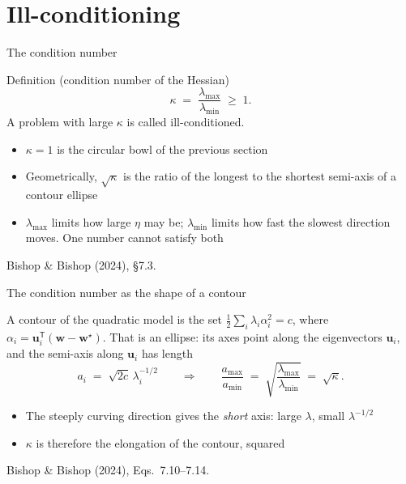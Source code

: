 \documentclass[aspectratio=169, 11pt]{beamer}
\newcommand{\srcline}[1]{%
  \par\vspace{0.25em}%
  {\scriptsize\color{mcMuted}\hfill #1\par}}
\newcommand{\src}[3]{}      %
\begin{document}
\section{Ill-conditioning}

\begin{frame}{The condition number}
  \src{bishop2024}{section}{7.3}
  \begin{block}{Definition (condition number of the Hessian)}
    \[
      \kappa \;=\; \frac{\lambda_{\max}}{\lambda_{\min}} \;\geq\; 1 .
    \]
    A problem with large $\kappa$ is called \alert{ill-conditioned}.
  \end{block}
  \vspace{0.4em}
  \begin{itemize}\itemsep0.4em
    \item $\kappa = 1$ is the circular bowl of the previous section
    \item Geometrically, $\sqrt{\kappa}$ is the ratio of the longest to
          the shortest semi-axis of a contour ellipse
    \item $\lambda_{\max}$ limits how large $\eta$ may be;
          $\lambda_{\min}$ limits how fast the slowest direction moves.
          One number cannot satisfy both
  \end{itemize}
  \srcline{Bishop \& Bishop (2024), \S7.3.}
\end{frame}

\begin{frame}{The condition number as the shape of a contour}
  \src{bishop2024}{figure}{7.2}
  \src{bishop2024}{equation}{7.10-7.14}
  \src{bishop2024}{section}{7.1.1}
  \vspace{-0.1em}
  A contour of the quadratic model is the set
  $\tfrac12\sum_i \lambda_i \alpha_i^2 = c$, where
  $\alpha_i = \mathbf{u}_i^{\mathsf T}(\mathbf{w}-\mathbf{w}^\star)$.
  That is an \alert{ellipse}: its axes point along the eigenvectors
  $\mathbf{u}_i$, and the semi-axis along $\mathbf{u}_i$ has length
  \[
    a_i \;=\; \sqrt{2c}\,\lambda_i^{-1/2}
    \qquad\Longrightarrow\qquad
    \frac{a_{\max}}{a_{\min}}
      \;=\; \sqrt{\frac{\lambda_{\max}}{\lambda_{\min}}}
      \;=\; \sqrt{\kappa}.
  \]
  \vspace{-0.4em}
  \begin{itemize}\itemsep0.35em
    \item The steeply curving direction gives the \emph{short} axis:
          large $\lambda$, small $\lambda^{-1/2}$
    \item $\kappa$ is therefore the elongation of the contour, squared
  \end{itemize}
  \srcline{Bishop \& Bishop (2024), Eqs.~7.10--7.14.}
\end{frame}
\end{document}
